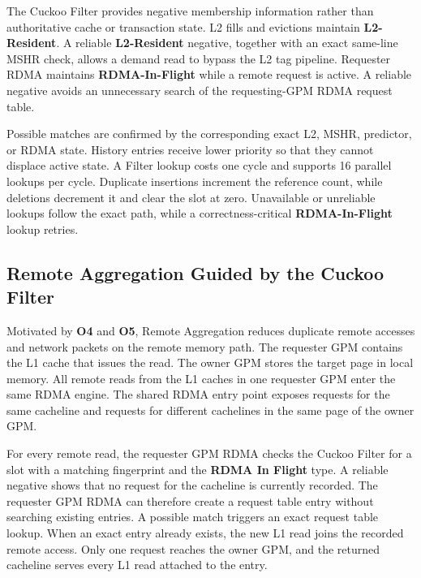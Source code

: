 The Cuckoo Filter provides negative membership information rather than
authoritative cache or transaction state. L2 fills and evictions maintain
\textbf{L2-Resident}. A reliable \textbf{L2-Resident} negative, together with
an exact same-line MSHR check, allows a demand read to bypass the L2 tag
pipeline. Requester RDMA maintains \textbf{RDMA-In-Flight} while a remote
request is active. A reliable negative avoids an unnecessary search of the
requesting-GPM RDMA request table.

Possible matches are confirmed by the corresponding exact L2, MSHR, predictor,
or RDMA state. History entries receive lower priority so that they cannot
displace active state. A Filter lookup costs one cycle and supports 16 parallel
lookups per cycle. Duplicate insertions increment the reference count, while
deletions decrement it and clear the slot at zero. Unavailable or unreliable
lookups follow the exact path, while a correctness-critical
\textbf{RDMA-In-Flight} lookup retries.

\subsection{Remote Aggregation Guided by the Cuckoo Filter}
\label{sec:design-remote-aggregation}

Motivated by \textbf{O4} and \textbf{O5}, Remote Aggregation reduces
duplicate remote accesses and network packets on the remote memory path. The
requester GPM contains the L1 cache that issues the read. The owner GPM stores
the target page in local memory. All remote reads from the L1 caches in one
requester GPM enter the same RDMA engine. The shared RDMA entry point exposes
requests for the same cacheline and requests for different cachelines in the
same page of the owner GPM.

For every remote read, the requester GPM RDMA checks the Cuckoo Filter for a
slot with a matching fingerprint and the \textbf{RDMA In Flight} type. A
reliable negative shows that no request for the cacheline is currently
recorded. The requester GPM RDMA can therefore create a request table entry
without searching existing entries. A possible match triggers an exact
request table lookup. When an exact entry already exists, the new L1 read
joins the recorded remote access. Only one request reaches the owner GPM, and
the returned cacheline serves every L1 read attached to the entry.

